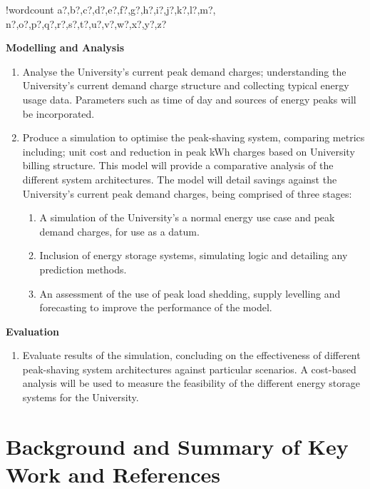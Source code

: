 \documentclass[fontsize=9.5pt]{extarticle}
\newcounter{words}
\newenvironment{counted}{%
  \setcounter{words}{0}
  \SearchList!{wordcount}{\stepcounter{words}}
    {a?,b?,c?,d?,e?,f?,g?,h?,i?,j?,k?,l?,m?,
    n?,o?,p?,q?,r?,s?,t?,u?,v?,w?,x?,y?,z?}
  \UndoBoundary{'}
  \SearchOrder{p;}}{%
  \StopSearching}
\begin{document}
\begin{counted}
\begin{enumerate}[resume]
\end{enumerate}

\textbf{Modelling and Analysis}

\begin{enumerate}[resume]
\item Analyse the University’s current peak demand charges; understanding the University’s current demand charge structure and collecting typical energy usage data. Parameters such as time of day and sources of energy peaks will be incorporated.
\item Produce a simulation to optimise the peak-shaving system, comparing metrics including; unit cost and reduction in peak kWh charges based on University billing structure. This model will provide a comparative analysis of the different system architectures. The model will detail savings against the University’s current peak demand charges, being comprised of three stages:
\begin{enumerate}
\item A simulation of the University's a normal energy use case and peak demand charges, for use as a datum.
\item Inclusion of energy storage systems, simulating logic and detailing any prediction methods.
\item An assessment of the use of peak load shedding, supply levelling and forecasting to improve the performance of the model.
\end{enumerate}
\end{enumerate}

\textbf{Evaluation}

\begin{enumerate}[resume]
\item Evaluate results of the simulation, concluding on the effectiveness of different peak-shaving system architectures against particular scenarios. A cost-based analysis will be used to measure the feasibility of the different energy storage systems for the University.
\end{enumerate}

\newpage

\section{Background and Summary of Key Work and
References}\label{background-and-summary-of-key-work-and-references}


\end{counted}
\end{document}
